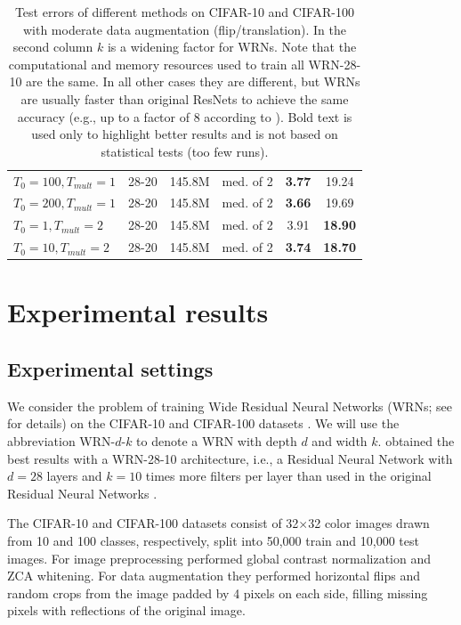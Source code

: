\documentclass{article} %
\begin{document}
\begin{table}[t]
\begin{center}
\begin{tabular}{ l | c | c | c | c | c }
		$T_0=100, T_{mult}=1$	& 28-20 &  145.8M & med. of 2			& \textbf{3.77} & 19.24 \\
		$T_0=200, T_{mult}=1$	& 28-20 &  145.8M & med. of 2 		& \textbf{3.66} & 19.69 \\
		$T_0=1, T_{mult}=2$		& 28-20 &  145.8M & med. of 2		& 3.91 & \textbf{18.90} \\
		$T_0=10, T_{mult}=2$	& 28-20 &  145.8M & med. of 2			& \textbf{3.74} & \textbf{18.70} \\
    \hline
  \end{tabular}
\end{center}
\caption{Test errors of different methods on CIFAR-10 and CIFAR-100 with moderate data
augmentation (flip/translation). In the second column $k$ is a widening factor for WRNs.  Note that the computational and memory resources used to train all WRN-28-10 are the same. In all other cases they are different, but WRNs are usually faster than original  ResNets to achieve the same accuracy (e.g., up to a factor of 8 according to \cite{zagoruyko2016wide}). Bold text is used only to highlight better results and is not based on statistical tests (too few runs).}
\end{table}





\section{Experimental results}

\subsection{Experimental settings}

We consider the problem of training Wide Residual Neural Networks (WRNs; see \cite{zagoruyko2016wide} for details) 
 on the CIFAR-10 and CIFAR-100 datasets \citep{krizhevsky2009learning}. 
We will use the abbreviation WRN-$d$-$k$ 
to denote a WRN with depth $d$ and width $k$. 
\cite{zagoruyko2016wide} obtained the best results with a WRN-28-10 architecture, 
i.e., a Residual Neural Network with $d=28$ layers and $k=10$ times more filters 
per layer than used in the original Residual Neural Networks \citep{he2015deep,he2016identity}. 



The CIFAR-10 and CIFAR-100 datasets \citep{krizhevsky2009learning} consist of 32$\times$32 color images drawn from 10 and 100 classes, respectively, split into 50,000 train and 10,000 test images. 
For image preprocessing \cite{zagoruyko2016wide} performed 
global contrast normalization and ZCA whitening. For data augmentation they performed horizontal
flips and random crops from the image padded by 4 pixels on each side, filling missing
pixels with reflections of the original image. 
\end{document}
